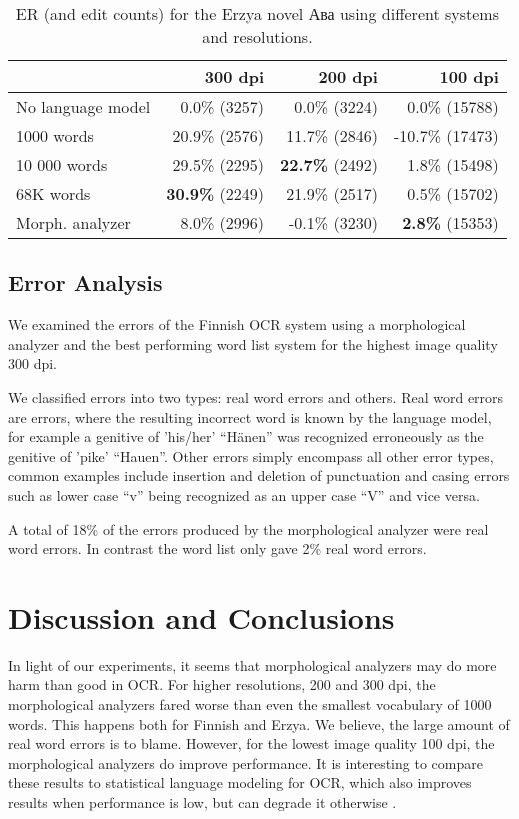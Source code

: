 \documentclass[b5paper]{article}
\begin{document}
\begin{table}[!htb]
\begin{center}
\begin{tabular}{lrrr}
\hline 
                  & 300 dpi & 200 dpi & 100 dpi \\
\hline 
No language model &  0.0\% (3257)  &  0.0\% (3224)  &  0.0\% (15788)  \\
1000 words        &  20.9\% (2576)  &  11.7\% (2846)  & -10.7\%  (17473) \\
10 000 words      &  29.5\% (2295)  &   {\bf 22.7\%} (2492)  & 1.8\% (15498)  \\
68K words         &  {\bf 30.9\%} (2249)  &  21.9\% (2517)  & 0.5\% (15702)\\
Morph. analyzer   &  8.0\% (2996)  &  -0.1\% (3230)  & {\bf 2.8\%} (15353)  \\
\hline 
\end{tabular}
\caption{ER (and edit counts) for the Erzya novel Ава using different systems and resolutions.}\label{myv-novel-res}
\end{center}
\end{table}

\subsection{Error Analysis}

We examined the errors of the Finnish OCR system using a morphological
analyzer and the best performing word list system for the highest
image quality 300 dpi.

We classified errors into two types: real word errors and others. Real
word errors are errors, where the resulting incorrect word is known by
the language model, for example a genitive of
'his/her' ``Hänen'' was recognized erroneously as the genitive
of 'pike' ``Hauen''. Other errors simply encompass all other error
types, common examples include insertion and deletion of punctuation
and casing errors such as lower case ``v'' being recognized as an
upper case ``V'' and vice versa.

A total of 18\% of the errors produced by the morphological analyzer
were real word errors. In contrast the word list only gave 2\% real
word errors.

\section{Discussion and Conclusions}
\label{disc}

In light of our experiments, it seems that morphological analyzers may
do more harm than good in OCR. For higher resolutions, 200 and 300 dpi,
the morphological analyzers fared worse than even the smallest
vocabulary of 1000 words. This happens both for Finnish and Erzya. We
believe, the large amount of real word errors is to blame. However,
for the lowest image quality 100 dpi, the morphological analyzers do
improve performance. It is interesting to compare these results to
statistical language modeling for OCR, which also improves results
when performance is low, but can degrade it otherwise \cite{smith11}.
\end{document}
